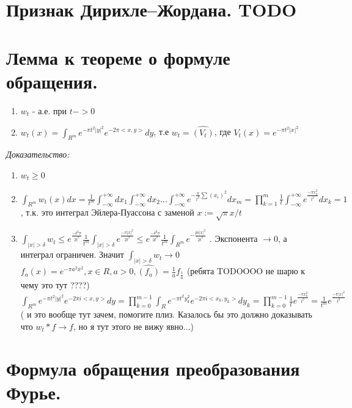 \documentclass[paper=a4, fontsize=17pt]{article}
\begin{document}
\section{Признак Дирихле--Жордана. TODO}
\section{Лемма к теореме о формуле обращения.}

\begin{enumerate}
	\item ${w_t}$ - а.е. при $t->0$
	\item $w_t(x) = \int_{R^m} e^{-\pi t^2 |y|^2} e^{-2\pi <x, y>} dy$, т.е $w_t = \hat{(V_t)}$, где $V_t(x) = e^{-\pi t^2 |x|^2}$
\end{enumerate}
\emph{Доказательство:}
\begin{enumerate}
	\item $w_t \geq 0$
	\item $\int_{R^m} w_t(x) dx = \frac{1}{t^m}\int_{-\infty}^{+\infty} dx_1 \int_{-\infty}^{+\infty} dx_2 \dots \int_{-\infty}^{+\infty} e^{-\frac{\pi}{t^2} \sum (x_i)^2} dx_m = \prod_{k=1}^{m} \frac{1}{t} \int_{-\infty}^{+\infty} e^{\frac{-\pi x_k^2}{t^2}} dx_k = 1$, т.к. это интеграл Эйлера-Пуассона с заменой $x := \sqrt\pi x / t$
	\item $\int_{|x| > \delta} w_t \leq e^{\frac{-\delta^2 \pi}{2 t^2}} \frac{1}{t^m} \int_{|x| > \delta} e^{\frac{-\pi |x|^2}{2 t^2}} \leq e^{\frac{-\delta^2 \pi}{2 t^2}} \frac{1}{t^m} \int_{R^m} e^{-\frac{pi |x|^2}{2t^2}}$ . Экспонента $\rightarrow 0$, а интеграл ограничен. Значит $\int_{|x| > \delta} w_t \rightarrow 0$ \\
	$f_a(x) = e^{-\pi a^2 x^2}, x \in R, a > 0, \hat{(f_a)} = \frac{1}{a} f_{\frac{1}{a}}$ (ребята TODOOOO не шарю к чему это тут ????)\\ 
	$\int_{R^m} e^{-\pi t^2 |y|^2} e^{- 2 \pi i <x, y>} dy = \prod_{k=0}^{m-1} \int_{R} e^{-\pi t^2 y_k^2} e^{- 2 \pi i <x_k, y_k>} dy_k = \prod_{k=0}^{m-1} \frac{1}{t} e^{\frac{-\pi x_k^2}{t^2}} = \frac{1}{t^m} e^{\frac{-\pi |x|^2}{t^2}}$  ( и это вообще тут зачем, помогите плиз. Казалось бы это должно доказывать что $w_t * f \rightarrow f$, но я тут этого не вижу явно...)
	
\end{enumerate}


\section{Формула обращения преобразования Фурье.}
\end{document}
